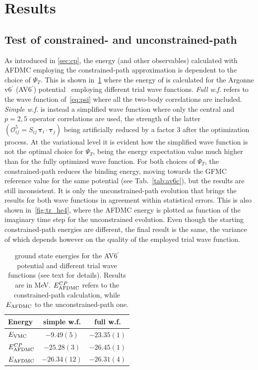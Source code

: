 \documentclass[aps,prc,twocolumn,superscriptaddress,showpacs,floatfix,nofootinbib]{revtex4-1}
\begin{document}
\section{Results}
\label{sec:res}


\subsection{Test of constrained- and unconstrained-path}
As introduced in \cref{sec:cp}, the energy (and other observables) calculated with AFDMC
employing the constrained-path approximation is dependent to the choice of $\Psi_T$.
This is shown in~\cref{tab:tr} where the energy of  
is calculated for the Argonne v6$^\prime$ (AV6$^\prime$) potential~\cite{Wiringa:2002} 
employing different trial wave functions. 
\textit{Full w.f.} refers to the wave function of~\cref{eq:psi} where all the two-body 
correlations are included.
\textit{Simple w.f.} is instead a simplified wave function where only the central and
$p=2,5$ operator correlations are used, the strength of the latter 
$(\mathcal O_{ij}^5=S_{ij}\,\bm\tau_i\cdot\bm\tau_j)$ being artificially reduced by 
a factor 3 after the optimization process. At the variational level it is evident how
the simplified wave function is not the optimal choice for $\Psi_T$, being the energy
expectation value much higher than for the fully optimized wave function. For both choices
of $\Psi_T$, the constrained-path reduces the binding energy, moving towards the
GFMC reference value for the same potential (see Tab.~\ref{tab:av6c}), but the results are still inconsistent.
It is only the unconstrained-path evolution that brings the results for both wave functions 
in agreement within statistical errors. This is also shown in~\cref{fig:tr_he4}, where the 
AFDMC energy is plotted as function of the imaginary time step for the unconstrained evolution. 
Even though the starting constrained-path energies are different, the final result is the same, the 
variance of which depends however on the quality of the employed trial wave function. 

\begin{table}[htb]
\centering
\caption[]{ ground state energies for the AV6$^\prime$ potential and different 
trial wave functions (see text for details). Results are in MeV.
$E_{\rm AFDMC}^{CP}$ refers to the constrained-path calculation, while
$E_{\rm AFDMC}$ to the unconstrained-path one.}
\begin{tabular}{lcc}
\hline\hline
Energy & simple w.f. & full w.f. \\
\hline
$E_{\rm VMC}$        & $-9.49(5)$   & $-23.35(1)$ \\
$E_{\rm AFDMC}^{CP}$ & $-25.28(3)$  & $-26.45(1)$ \\
$E_{\rm AFDMC}$      & $-26.34(12)$ & $-26.31(4)$ \\
\hline\hline
\end{tabular}
\label{tab:tr}
\end{table}
\end{document}
